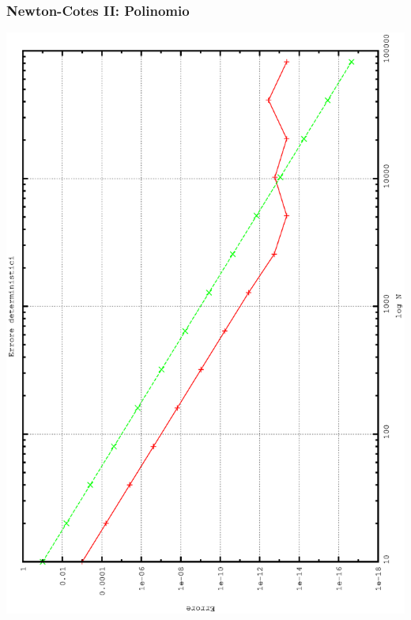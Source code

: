 \subsubsection*{Newton-Cotes II: Polinomio}
\begin{center}
\includegraphics[width=0.7\columnwidth,angle=-90]{plot_simp_poly.eps}
\end{center}

